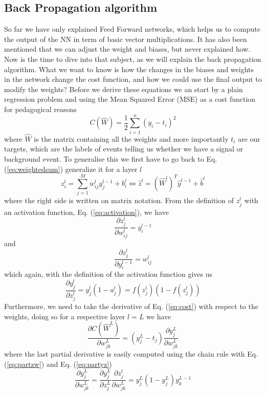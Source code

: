 \documentclass[14pt, a4paper]{book}
\begin{document}
\subsection{Back Propagation algorithm}
So far we have only explained Feed Forward networks, which helps us to compute the output of the NN in term of basic vector multiplications. It has also been mentioned that we can adjust the weight and biases, but never explained how. 
Now is the time to dive into that subject, as we will explain the back propagation algorithm. What we want to know is how the changes in the biases and weights in the network change the cost function, and how we could use the final 
output to modify the weights? Before we derive these equations we an start by a plain regression problem and using the Mean Squared Error (MSE) as a cost function for pedagogical reasons
\begin{equation}\label{eq:cost}
    C(\hat{W})=\frac{1}{2}\sum_{i=1}^n(y_i-t_i)^2
\end{equation}
where $\hat{W}$ is the matrix containing all the weights and more importantly $t_i$ are our targets, which are the labels of events telling us whether we have a signal or background event. To generalise this we 
first have to go back to Eq. (\ref{eq:weightedsum}) generalize it for a layer $l$
$$
    z_i^l=\sum_{j=1}^Mw^l_{ij}y^{l-1}_j + b^l_i \Leftrightarrow \hat{z}^l=\left(\hat{W}^l\right)^T\hat{y}^{l-1} + \hat{b}^l
$$
where the right side is written on matrix notation. From the definition of $z_j^l$ with an activation function, Eq. (\ref{eq:activation}), we have
\begin{equation}\label{eq:partzw}
    \frac{\partial z_j^l}{\partial w_{ij}^l} = y_i^{l-1}
\end{equation}
and
$$
\frac{\partial z_j^l}{\partial y_i^{l-1}} = w_{ij}^l
$$
which again, with the definition of the activation function gives us
\begin{equation}\label{eq:partyz}
    \frac{\partial y^l_j}{\partial z_j^{l}} = y_j^l(1-a_j^l)=f(z_j^l)(1-f(z_j^l))
\end{equation}
Furthermore, we need to take the derivative of Eq. (\ref{eq:cost}) with respect to the weights, doing so for a respective layer $l=L$ we have
$$
    \frac{\partial C(\hat W ^L) }{\partial w_{jk}^L}=\left(y_j^L-t_j\right)\frac{\partial y_j^L}{\partial w_{jk}^L}
$$
where the last partial derivative is easily computed using the chain rule with Eq. (\ref{eq:partzw}) and Eq. (\ref{eq:partyz})
$$
\frac{\partial y_j^L}{\partial w_{jk}^L} = \frac{\partial y^L_j}{\partial z_j^{L}}\frac{\partial z_j^l}{\partial w_{jk}^L} = y_j^L(1-y_j^L)y_k^{L-1}
$$
\end{document}
